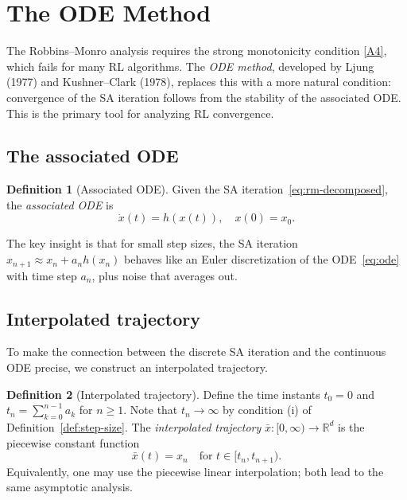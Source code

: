 \documentclass[11pt,a4paper]{article}
\theoremstyle{definition}
\newtheorem{definition}{Definition}[section]
\theoremstyle{plain}
\theoremstyle{remark}
\newcommand{\R}{\mathbb{R}}
\begin{document}
\section{The ODE Method}
\label{sec:ode-method}

The Robbins--Monro analysis requires the strong monotonicity condition \ref{A4},
which fails for many RL algorithms. The \emph{ODE method}, developed by Ljung (1977)
and Kushner--Clark (1978), replaces this with a more natural condition: convergence of
the SA iteration follows from the stability of the associated ODE. This is the
primary tool for analyzing RL convergence.

\subsection{The associated ODE}

\begin{definition}[Associated ODE]
\label{def:associated-ode}
Given the SA iteration~\eqref{eq:rm-decomposed}, the \emph{associated ODE} is
\begin{equation}
\label{eq:ode}
  \dot{x}(t) = h(x(t)), \quad x(0) = x_0.
\end{equation}
\end{definition}

The key insight is that for small step sizes, the SA iteration
$x_{n+1} \approx x_n + a_n h(x_n)$ behaves like an Euler discretization of the
ODE~\eqref{eq:ode} with time step $a_n$, plus noise that averages out.

\subsection{Interpolated trajectory}

To make the connection between the discrete SA iteration and the continuous ODE
precise, we construct an interpolated trajectory.

\begin{definition}[Interpolated trajectory]
\label{def:interpolated-traj}
Define the time instants $t_0 = 0$ and $t_n = \sum_{k=0}^{n-1} a_k$ for $n \geq 1$.
Note that $t_n \to \infty$ by condition (i) of Definition~\ref{def:step-size}. The
\emph{interpolated trajectory} $\bar{x} : [0, \infty) \to \R^d$ is the piecewise
constant function
\[
  \bar{x}(t) = x_n \quad \text{for } t \in [t_n, t_{n+1}).
\]
Equivalently, one may use the piecewise linear interpolation; both lead to the same
asymptotic analysis.
\end{definition}
\end{document}
